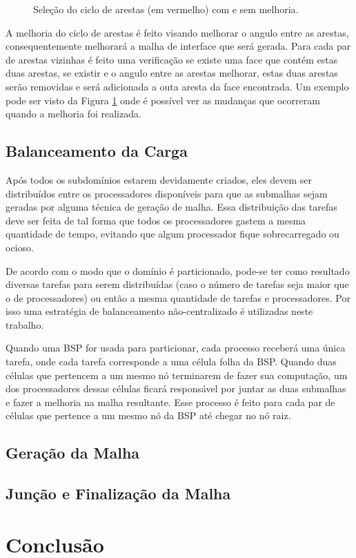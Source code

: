 \begin{figure}[ht]
{	}
	\caption{Seleção do ciclo de arestas (em vermelho) com e sem melhoria.}
	\label{fig:melhoria_arestas_faces}
\end{figure}


A melhoria do ciclo de arestas é feito visando melhorar o angulo entre as arestas, consequentemente melhorará a malha de interface que será gerada. Para cada par de arestas vizinhas é feito uma verificação se existe uma face que contém estas duas arestas, se existir e o angulo entre as arestas melhorar, estas duas arestas serão removidas e será adicionada a outa aresta da face encontrada. Um exemplo pode ser visto da Figura \ref{fig:melhoria_arestas_faces} onde é possível ver as mudanças que ocorreram quando a melhoria foi realizada.

\subsection{Balanceamento da Carga}


Após todos os subdomínios estarem devidamente criados, eles devem ser distribuídos entre os processadores disponíveis para que as submalhas sejam geradas por alguma técnica de geração de malha. Essa distribuição das tarefas deve ser feita de tal forma que todos os processadores gastem a mesma quantidade de tempo, evitando que algum processador fique sobrecarregado ou ocioso.

De acordo com o modo que o domínio é particionado, pode-se ter como resultado diversas tarefas para serem distribuídas (caso o número de tarefas seja maior que o de processadores) ou então a mesma quantidade de tarefas e processadores. Por isso uma estratégia de balanceamento não-centralizado é utilizadas neste trabalho.




Quando uma BSP for usada para particionar, cada processo receberá uma única tarefa, onde cada tarefa corresponde a uma célula folha da BSP. Quando duas células que pertencem a um mesmo nó terminarem de fazer sua computação, um dos processadores dessas células ficará responsável por juntar as duas submalhas e fazer a melhoria na malha resultante. Esse processo é feito para cada par de células que pertence a um mesmo nó da BSP até chegar no nó raiz.



\subsection{Geração da Malha}


\subsection{Junção e Finalização da Malha}


\section{Conclusão}
